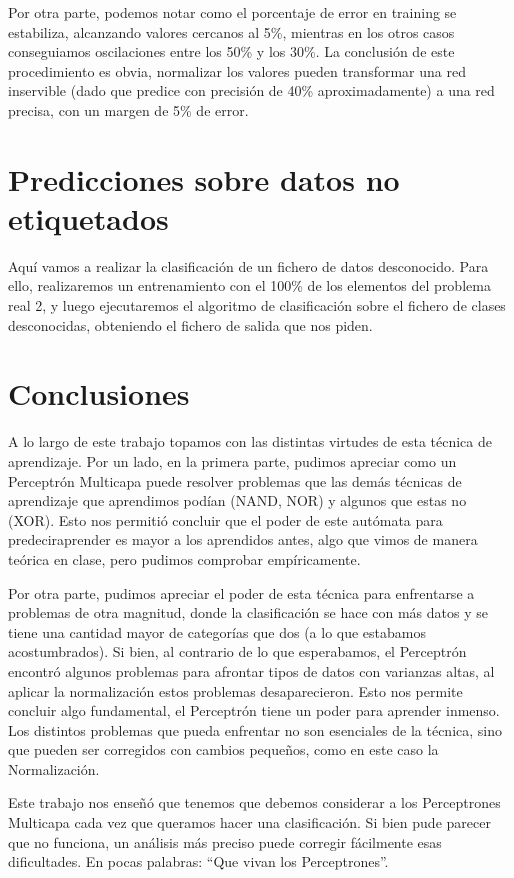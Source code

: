 \documentclass[12pt]{article}
\begin{document}

Por otra parte, podemos notar como el porcentaje de error en training se estabiliza, alcanzando valores cercanos al 5\%, mientras en los otros casos conseguiamos oscilaciones entre los 50\% y los 30\%. La conclusión de este procedimiento es obvia, normalizar los valores pueden transformar una red inservible (dado que predice con precisión de 40\% aproximadamente) a una red precisa, con un margen de 5\% de error.

\newpage


\section{Predicciones sobre datos no etiquetados}
Aquí vamos a realizar la clasificación de un fichero de datos desconocido. Para ello, realizaremos un entrenamiento con el 100\% de los elementos del problema real 2, y luego ejecutaremos el algoritmo de clasificación sobre el fichero de clases desconocidas, obteniendo el fichero de salida que nos piden.

\newpage

\section*{Conclusiones}
A lo largo de este trabajo topamos con las distintas virtudes de esta técnica de aprendizaje. Por un lado, en la primera parte, pudimos apreciar como un Perceptrón Multicapa puede resolver problemas que las demás técnicas de aprendizaje que aprendimos podían (NAND, NOR) y algunos que estas no (XOR). Esto nos permitió concluir que el poder de este autómata para predecir\/aprender es mayor a los aprendidos antes, algo que vimos de manera teórica en clase, pero pudimos comprobar empíricamente.

Por otra parte, pudimos apreciar el poder de esta técnica para enfrentarse a problemas de otra magnitud, donde la clasificación se hace con más datos y se tiene una cantidad mayor de categorías que dos (a lo que estabamos acostumbrados). Si bien, al contrario de lo que esperabamos, el Perceptrón encontró algunos problemas para afrontar tipos de datos con varianzas altas, al aplicar la normalización estos problemas desaparecieron. Esto nos permite concluir algo fundamental, el Perceptrón tiene un poder para aprender inmenso. Los distintos problemas que pueda enfrentar no son esenciales de la técnica, sino que pueden ser corregidos con cambios pequeños, como en este caso la Normalización.

Este trabajo nos enseñó que tenemos que debemos considerar a los Perceptrones Multicapa cada vez que queramos hacer una clasificación. Si bien pude parecer que no funciona, un análisis más preciso puede corregir fácilmente esas dificultades. En pocas palabras: ``Que vivan los Perceptrones''.
\end{document}
